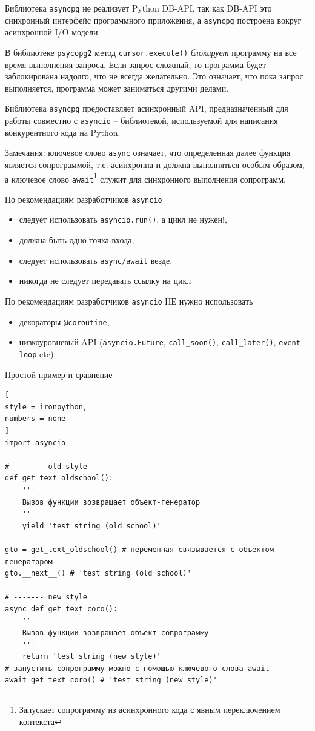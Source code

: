 \documentclass[%
	11pt,
	a4paper,
	utf8,
		]{article}
\begin{document}
Библиотека \texttt{asyncpg} не реализует Python DB-API, так как DB-API это синхронный интерфейс программного приложения, а \texttt{asyncpg} построена вокруг асинхронной I/O-модели.

В библиотеке \texttt{psycopg2} метод \texttt{cursor.execute()} \emph{блокирует} программу на все время выполнения запроса. Если запрос сложный, то программа будет заблокирована надолго, что не всегда желательно. Это означает, что пока запрос выполняется, программа может заниматься другими делами.

Библиотека \texttt{asyncpg} предоставляет асинхронный API, предназначенный для работы совместно с \texttt{asyncio} -- библиотекой, используемой для написания конкурентного кода на Python.

Замечания: ключевое слово \texttt{async} означает, что определенная далее функция является сопрограммой, т.е. асинхронна и должна выполняться особым образом, а ключевое слово \texttt{await}\footnote{Запускает сопрограмму из асинхронного кода с явным переключением контекста} служит для синхронного выполнения сопрограмм.

По рекомендациям разработчиков \texttt{asyncio}
\begin{itemize}
	\item следует использовать \texttt{asyncio.run()}, а цикл не нужен!,
	
	\item должна быть одно точка входа,
	
	\item следует использовать \texttt{async/await} везде,
	
	\item никогда не следует передавать ссылку на цикл
\end{itemize}

По рекомендациям разработчиков \texttt{asyncio} НЕ нужно использовать
\begin{itemize}
	\item декораторы \texttt{@coroutine},
	
	\item низкоуровневый API (\texttt{asyncio.Future}, \texttt{call\_soon()}, \texttt{call\_later()}, \texttt{event loop} etc)
\end{itemize}


Простой пример и сравнение
\begin{lstlisting}[
style = ironpython,
numbers = none
]
import asyncio

# ------- old style
def get_text_oldschool():
    '''
    Вызов функции возвращает объект-генератор
    '''
    yield 'test string (old school)'
    
gto = get_text_oldschool() # переменная связывается с объектом-генератором
gto.__next__() # 'test string (old school)'

# ------- new style
async def get_text_coro():
    '''
    Вызов функции возвращает объект-сопрограмму
    '''
    return 'test string (new style)'
# запустить сопрограмму можно с помощью ключевого слова await
await get_text_coro() # 'test string (new style)'
\end{lstlisting}
\end{document}
